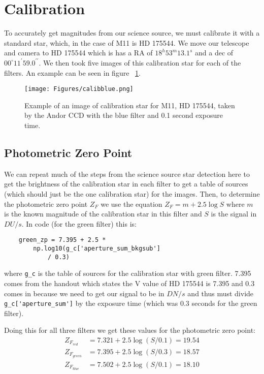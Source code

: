 \documentclass[twocolumn]{article}
\begin{document}
\section{Calibration}
To accurately get magnitudes from our science source, we must calibrate it with a standard star, which, in the case of M11 is HD 175544. We move our telescope and camera to HD 175544 which is has a RA of $18^h53^m13.1^s$ and a dec of $00^{\circ}11^{\prime}59.0^{\prime\prime}$. We then took five images of this calibration star for each of the filters. An example can be seen in figure ~\ref{fig:calibblue}.
\begin{figure}[h!]
    \texttt{[image: Figures/calibblue.png]}
    \caption{Example of an image of calibration star for M11, HD 175544, taken by the Andor CCD with the blue filter and 0.1 second exposure time.}
    \label{fig:calibblue}
\end{figure}
\subsection{Photometric Zero Point}
We can repeat much of the steps from the science source star detection here to get the brightness of the calibration star in each filter to get a table of sources (which should just be the one calibration star) for the images. Then, to determine the photometric zero point $Z_F$ we use the equation $Z_F = m + 2.5 \log S$ where $m$ is the known magnitude of the calibration star in this filter and $S$ is the signal in $DU/s$. In code (for the green filter) this is:
\begin{verbatim}
    green_zp = 7.395 + 2.5 * 
        np.log10(g_c['aperture_sum_bkgsub']
            / 0.3)
\end{verbatim}
where \verb|g_c| is the table of sources for the calibration star with green filter. 7.395 comes from the handout which states the V value of HD 175544 is 7.395 and 0.3 comes in because we need to get our signal to be in $DN/s$ and thus must divide \verb|g_c['aperture_sum']| by the exposure time (which was 0.3 seconds for the green filter).

Doing this for all three filters we get these values for the photometric zero point: 
\[
\begin{aligned}
Z_{F_{red}} &= 7.321 + 2.5\log(S/0.1) = 19.54 \\
Z_{F_{green}} &= 7.395 + 2.5\log(S/0.3) = 18.57 \\
Z_{F_{blue}} &= 7.502 + 2.5\log(S/0.1) = 18.10
\end{aligned}
\]
\end{document}
